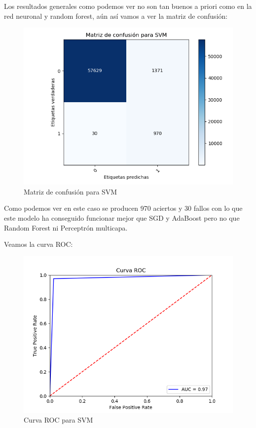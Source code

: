 Los resultados generales como podemos ver no son tan buenos a priori como en la red neuronal y random forest, aún así vamos a ver la matriz de confusión:

\begin{figure}[H] %
	\centering
	\includegraphics[scale=0.6]{SVM-CONF.png}  %
	\caption{Matriz de confusión para SVM} 
	\label{fig:conf-svm}
\end{figure}

Como podemos ver en este caso se producen 970 aciertos y 30 fallos con lo que este modelo ha conseguido funcionar mejor que SGD y AdaBoost pero no que Random Forest ni Perceptrón multicapa.

Veamos la curva ROC:

\begin{figure}[H] %
	\centering
	\includegraphics[scale=0.6]{SVM-ROC.png}  %
	\caption{Curva ROC para SVM} 
	\label{fig:roc-svm}
\end{figure}

